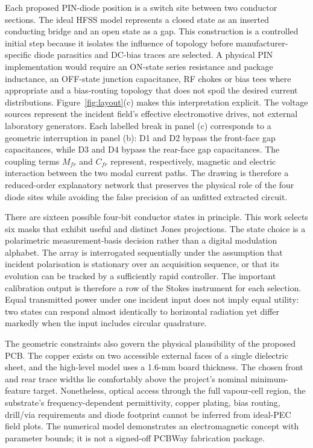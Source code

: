 \documentclass{ieeeaccess}
\begin{document}
Each proposed PIN-diode position is a switch site between two conductor sections. The ideal HFSS model represents a closed state as an inserted conducting bridge and an open state as a gap. This construction is a controlled initial step because it isolates the influence of topology before manufacturer-specific diode parasitics and DC-bias traces are selected. A physical PIN implementation would require an ON-state series resistance and package inductance, an OFF-state junction capacitance, RF chokes or bias tees where appropriate and a bias-routing topology that does not spoil the desired current distributions. Figure~\ref{fig:layout}(c) makes this interpretation explicit. The voltage sources represent the incident field's effective electromotive drives, not external laboratory generators. Each labelled break in panel (c) corresponds to a geometric interruption in panel (b): D1 and D2 bypass the front-face gap capacitances, while D3 and D4 bypass the rear-face gap capacitances. The coupling terms $M_{fr}$ and $C_{fr}$ represent, respectively, magnetic and electric interaction between the two modal current paths. The drawing is therefore a reduced-order explanatory network that preserves the physical role of the four diode sites while avoiding the false precision of an unfitted extracted circuit.

There are sixteen possible four-bit conductor states in principle. This work selects six masks that exhibit useful and distinct Jones projections. The state choice is a polarimetric measurement-basis decision rather than a digital modulation alphabet. The array is interrogated sequentially under the assumption that incident polarisation is stationary over an acquisition sequence, or that its evolution can be tracked by a sufficiently rapid controller. The important calibration output is therefore a row of the Stokes instrument for each selection. Equal transmitted power under one incident input does not imply equal utility: two states can respond almost identically to horizontal radiation yet differ markedly when the input includes circular quadrature.

The geometric constraints also govern the physical plausibility of the proposed PCB. The copper exists on two accessible external faces of a single dielectric sheet, and the high-level model uses a 1.6-mm board thickness. The chosen front and rear trace widths lie comfortably above the project's nominal minimum-feature target. Nonetheless, optical access through the full vapour-cell region, the substrate's frequency-dependent permittivity, copper plating, bias routing, drill/via requirements and diode footprint cannot be inferred from ideal-PEC field plots. The numerical model demonstrates an electromagnetic concept with parameter bounds; it is not a signed-off PCBWay fabrication package.
\end{document}
